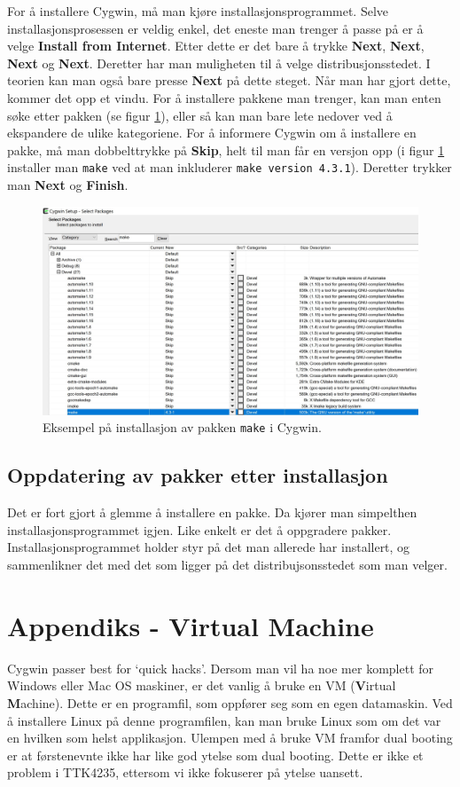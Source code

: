 For å installere Cygwin, må man kjøre installasjonsprogrammet. Selve installasjonsprosessen er veldig enkel, det eneste man trenger å passe på er å velge \textbf{Install from Internet}. Etter dette er det bare å trykke \textbf{Next}, \textbf{Next}, \textbf{Next} og \textbf{Next}. Deretter har man muligheten til å velge distribusjonsstedet. I teorien kan man også bare presse \textbf{Next} på dette steget. Når man har gjort dette, kommer det opp et vindu. For å installere pakkene man trenger, kan man enten søke etter pakken (se figur \ref{fig:Cygwin-setup}), eller så kan man bare lete nedover ved å ekspandere de ulike kategoriene. For å informere Cygwin om å installere en pakke, må man dobbelttrykke på \textbf{Skip}, helt til man får en versjon opp (i figur \ref{fig:Cygwin-setup} installer man \verb|make| ved at man inkluderer \verb|make version 4.3.1|). Deretter trykker man \textbf{Next} og \textbf{Finish}.

\begin{figure}[ht]
    \centering
    \includegraphics[scale=0.53]{figures/Capture.JPG}
    \caption{Eksempel på installasjon av pakken \texttt{make} i Cygwin.}
    \label{fig:Cygwin-setup}
\end{figure}

\subsection{Oppdatering av pakker etter installasjon}

Det er fort gjort å glemme å installere en pakke. Da kjører man simpelthen installasjonsprogrammet igjen. Like enkelt er det å oppgradere pakker. Installasjonsprogrammet holder styr på det man allerede har installert, og sammenlikner det med det som ligger på det distribujsonsstedet som man velger.

\section{Appendiks - Virtual Machine}\label{app:VM}
Cygwin passer best for `quick hacks'. Dersom man vil ha noe mer komplett for Windows eller Mac OS maskiner, er det vanlig å bruke en VM (\textbf{V}irtual \textbf{M}achine). Dette er en programfil, som oppfører seg som en egen datamaskin. Ved å installere Linux på denne programfilen, kan man bruke Linux som om det var en hvilken som helst applikasjon. Ulempen med å bruke VM framfor dual booting er at førstenevnte ikke har like god ytelse som dual booting. Dette er ikke et problem i TTK4235, ettersom vi ikke fokuserer på ytelse uansett.

